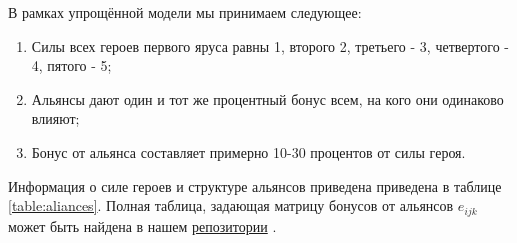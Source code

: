 \documentclass{article}
\begin{document}
В рамках упрощённой модели мы принимаем следующее:
\begin{enumerate}
\item Силы всех героев первого яруса равны 1, второго 2, третьего - 3, четвертого - 4, пятого - 5;
\item Альянсы дают один и тот же процентный бонус всем, на кого они одинаково влияют;
\item Бонус от альянса составляет примерно 10-30 процентов от силы героя.
\end{enumerate}

Информация о силе героев и структуре альянсов приведена приведена в таблице \ref{table:aliances}. 
Полная таблица, задающая матрицу бонусов от альянсов $e_{ijk}$ может быть найдена в нашем \href{https://github.com/aponom84/UnderLords/blob/master/UnderLordsData.xlsx}{репозитории} \cite{UnderLordsInput}.
\end{document}
